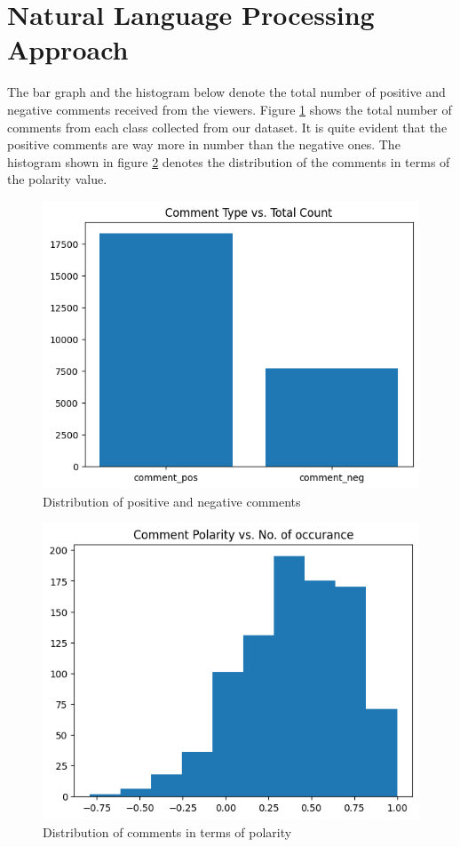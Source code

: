 \section{Natural Language Processing Approach}
The bar graph and the histogram below denote the total number of positive and negative comments received from the viewers. Figure \ref{fig_comment_type} shows the total number of comments from each class collected from our dataset. It is quite evident that the positive comments are way more in number than the negative ones. The histogram shown in figure \ref{fig_comment_hist} denotes the distribution of the comments in terms of the polarity value.

\begin{figure}[H]
    \begin{center}
        \includegraphics[width=0.6 \linewidth]{figures/comment_type.png}
        \caption{Distribution of positive and negative comments}
        \label{fig_comment_type}
    \end{center}
\end{figure}

\begin{figure}[H]
    \begin{center}
        \includegraphics[width=0.6 \linewidth]{figures/comment_polarity.png}
        \caption{Distribution of comments in terms of polarity}
        \label{fig_comment_hist}
    \end{center}
\end{figure}

